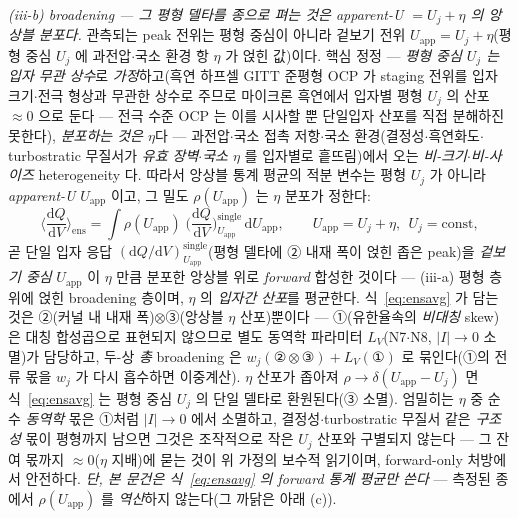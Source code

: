 \documentclass[11pt,a4paper]{article}
\newcommand{\dd}{\mathrm{d}}
\newcommand{\app}{\mathrm{app}}
\begin{document}
\emph{(iii-b) broadening — 그 평형 델타를 종으로 펴는 것은 \emph{apparent-U $=U_j+\eta$} 의 앙상블 분포다.} 관측되는 peak
전위는 평형 중심이 아니라 겉보기 전위 $U_\app=U_j+\eta$(평형 중심 $U_j$ 에 과전압$\cdot$국소 환경 항 $\eta$ 가 얹힌
값)이다. 핵심 정정 — \emph{평형 중심 $U_j$ 는 입자 무관 상수}로 \emph{가정}하고(흑연 하프셀 GITT 준평형 OCP 가 staging 전위를
입자 크기$\cdot$전극 형상과 무관한 상수로 주므로\cite{park2021} 마이크론 흑연에서 입자별 평형 $U_j$ 의 산포 $\approx0$ 으로 둔다 —
전극 수준 OCP 는 이를 시사할 뿐 단일입자 산포를 직접 분해하진 못한다), \emph{분포하는 것은 $\eta$}다 —
과전압$\cdot$국소 접촉 저항$\cdot$국소 환경(결정성$\cdot$흑연화도$\cdot$turbostratic 무질서가 \emph{유효 장벽$\cdot$국소
$\eta$} 를 입자별로 흩뜨림)에서 오는 \emph{비-크기$\cdot$비-사이즈} heterogeneity 다. 따라서 앙상블 통계 평균의 적분
변수는 평형 $U_j$ 가 아니라 \emph{apparent-U} $U_\app$ 이고, 그 밀도 $\rho(U_\app)$ 는 $\eta$ 분포가 정한다:
\begin{equation}
\Big\langle\frac{\dd Q}{\dd V}\Big\rangle_\mathrm{ens}
=\int \rho(U_\app)\;\Big(\frac{\dd Q}{\dd V}\Big)^\mathrm{single}_{U_\app}\,\dd U_\app,
\qquad U_\app=U_j+\eta,\ \ U_j=\text{const},
\label{eq:ensavg}
\end{equation}
곧 단일 입자 응답 $(\dd Q/\dd V)^\mathrm{single}_{U_\app}$(평형 델타에 ② 내재 폭이 얹힌 좁은 peak)을 \emph{겉보기 중심}
$U_\app$ 이 $\eta$ 만큼 분포한 앙상블 위로 \emph{forward} 합성한 것이다 — (iii-a) 평형 층 위에 얹힌
broadening 층이며, $\eta$ 의 \emph{입자간 산포}를 평균한다. 식~\eqref{eq:ensavg} 가 담는 것은
②(커널 내 내재 폭)$\otimes$③(앙상블 $\eta$ 산포)뿐이다 — ①(유한율속의 \emph{비대칭} skew)은 대칭 합성곱으로
표현되지 않으므로 별도 동역학 파라미터 $L_V$(N7$\cdot$N8, $|I|\!\to\!0$ 소멸)가 담당하고, 두-상 \emph{총}
broadening 은 $w_j(\text{②}\otimes\text{③})+L_V(\text{①})$ 로 묶인다(①의 전류 몫을 $w_j$ 가 다시 흡수하면
이중계산). $\eta$ 산포가 좁아져 $\rho\!\to\!\delta(U_\app-U_j)$ 면 식~\eqref{eq:ensavg} 는 평형 중심 $U_j$
의 단일 델타로 환원된다(③ 소멸).
엄밀히는 $\eta$ 중 순수 \emph{동역학} 몫은 ①처럼 $|I|\!\to\!0$ 에서 소멸하고, 결정성$\cdot$turbostratic 무질서 같은
\emph{구조성} 몫이 평형까지 남으면 그것은 조작적으로 작은 $U_j$ 산포와 구별되지 않는다 — 그 잔여 몫까지
$\approx0$($\eta$ 지배)에 묻는 것이 위 가정의 보수적 읽기이며, forward-only 처방에서 안전하다. \emph{단, 본 문건은 식~\eqref{eq:ensavg} 의 forward 통계 평균만
쓴다} — 측정된 종에서 $\rho(U_\app)$ 를 \emph{역산}하지 않는다(그 까닭은 아래 (c)).
\end{document}
